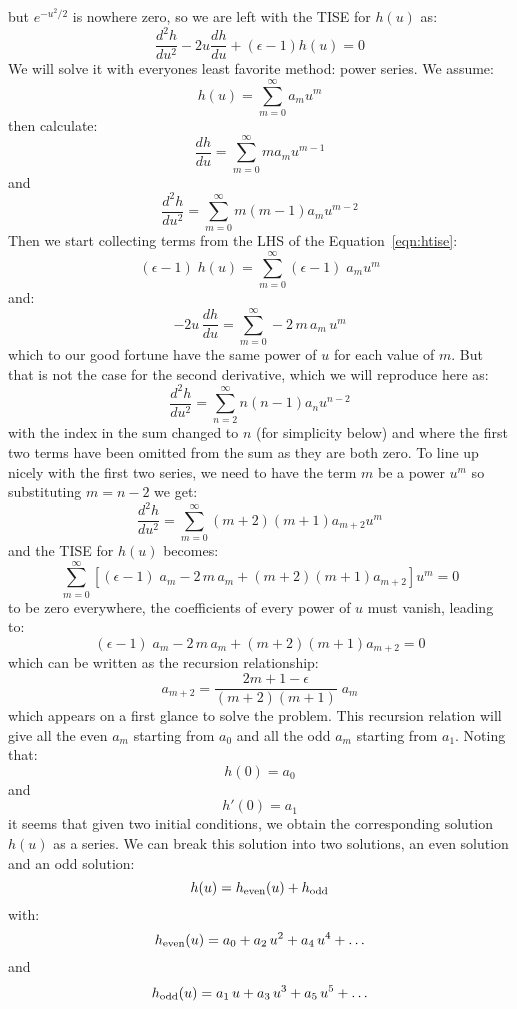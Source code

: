 \documentclass[12pt]{book}
\begin{document}
but $e^{-u^2/2}$ is nowhere zero, so we are left with the TISE for $h(u)$ as:
\begin{equation}
\label{eqn:htise}
\frac{d^2h}{du^2} - 2 u \frac{dh}{du} + (\epsilon-1)h(u) = 0
\end{equation}
We will solve it with everyones least favorite method: power series.  We assume:
$$h(u) = \sum_{m=0}^{\infty} a_m u^m$$
then calculate:
$$\frac{dh}{du} = \sum_{m=0}^{\infty} m a_m u^{m-1}$$
and
$$\frac{d^2h}{du^2} = \sum_{m=0}^{\infty} m (m-1) a_m u^{m-2}$$
Then we start collecting terms from the LHS of the Equation~\ref{eqn:htise}:
$$(\epsilon-1)\;h(u) = \sum_{m=0}^{\infty} (\epsilon-1)\;a_m u^m$$
and:
$$-2 u \, \frac{dh}{du} = \sum_{m=0}^{\infty} -2 \, m \, a_m \, u^{m}$$
which to our good fortune have the same power of $u$ for each value of $m$.  But that is not the case for the second derivative, which we will reproduce here as:
$$\frac{d^2h}{du^2} = \sum_{n=2}^{\infty} n (n-1) a_n u^{n-2}$$
with the index in the sum changed to $n$ (for simplicity below) and where the first two terms have been omitted from the sum as they are both zero.  To line up nicely with the first two series, we need to have the term $m$ be a power $u^m$ so substituting $m = n - 2$ we get:
$$\frac{d^2h}{du^2} = \sum_{m=0}^{\infty} (m+2) (m+1) a_{m+2} u^{m}$$
and the TISE for $h(u)$ becomes:
$$\sum_{m=0}^{\infty} \left[(\epsilon-1)\;a_m -2 \, m \, a_m + (m+2) (m+1) a_{m+2} \right] u^{m} = 0$$
to be zero everywhere, the coefficients of every power of $u$ must vanish, leading to:
$$(\epsilon-1)\;a_m -2 \, m \, a_m + (m+2) (m+1) a_{m+2} = 0$$
which can be written as the recursion relationship:
\begin{equation}
\label{eqn:hermrec}
a_{m+2} = \frac{2m+1-\epsilon}{(m+2)(m+1)} \; a_m
\end{equation}
which appears on a first glance to solve the problem.  This recursion relation will give all the even $a_m$ starting from $a_0$ and all the odd $a_m$ starting from $a_1$. Noting that:
$$h(0) = a_0$$
and 
$$h'(0) = a_1$$
it seems that given two initial conditions, we obtain the corresponding solution $h(u)$ as a series.  
We can break this solution into two solutions, an even solution and an odd solution:
$$h(u) = h_{\rm even}(u) + h_{\rm odd}$$
with:
$$h_{\rm even}(u) = a_0 + a_2 \, u^2 + a_4 \, u^4 + \ldots$$
and 
$$h_{\rm odd}(u) = a_1 \, u + a_3 \, u^3 + a_5 \, u^5 + \ldots$$
\end{document}
